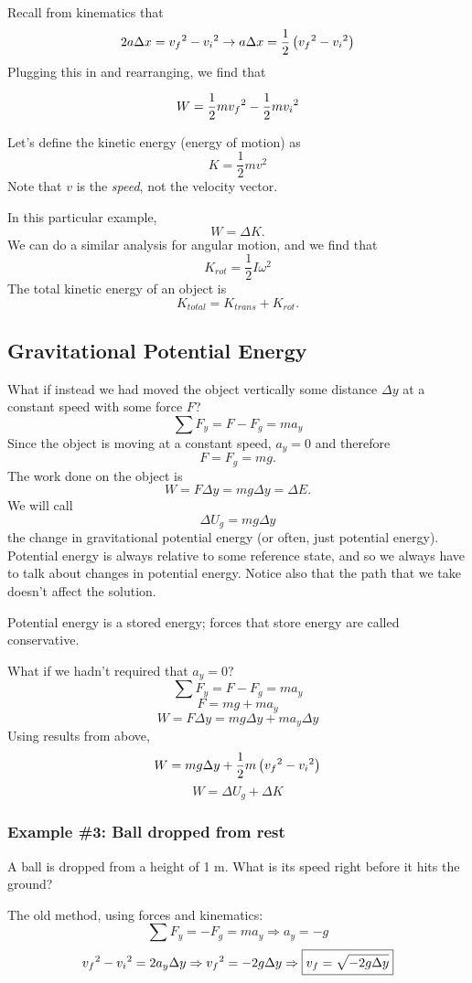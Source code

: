 Recall from kinematics that
$$2a\Delta x = v_f\displaystyle^2-v_i\displaystyle^2\rightarrow a\Delta x = \frac{1}{2}\left(v_f\displaystyle^2-v_i\displaystyle^2\right) $$
Plugging this in and rearranging, we find that

$$W=\frac{1}{2}mv_f\displaystyle^2-\frac{1}{2}mv_i\displaystyle^2$$

Let's define the kinetic energy (energy of motion) as
$$\boxed{K=\frac{1}{2}mv^2}$$
Note that $v$ is the \textit{speed}, not the velocity vector. 

In this particular example,
$$W=\Delta{K}.$$
We can do a similar analysis for angular motion, and we find that
$$\boxed{K_{rot}=\frac{1}{2}I\omega^2}$$
The total kinetic energy of an object is
$$K_{total}=K_{trans}+K_{rot}.$$

\subsection{Gravitational Potential Energy}
What if instead we had moved the object vertically some distance $\Delta y$ at a constant speed with some force $F$?
$$\sum F_y=F-F_g=ma_y$$
Since the object is moving at a constant speed, $a_y=0$ and therefore
$$F=F_g=mg.$$
The work done on the object is
$$W=F\Delta{y}=mg\Delta{y}=\Delta{E}.$$
We will call
$$\boxed{\Delta{U_g}=mg\Delta{y}}$$
the change in gravitational potential energy (or often, just potential energy). Potential energy is always relative to some reference state, and so we always have to talk about changes in potential energy. Notice also that the path that we take doesn't affect the solution.

Potential energy is a stored energy; forces that store energy are called conservative.

What if we hadn't required that $a_y=0$?
$$\sum F_y=F-F_g=ma_y$$
$$F=mg+ma_y$$
$$W = F\Delta y = mg\Delta y + ma_y\Delta y$$
Using results from above,
$$W = mg\Delta y + \frac{1}{2}m\left(v_f\displaystyle^2-v_i\displaystyle^2\right)$$
$$W = \Delta U_g + \Delta K$$


\subsubsection*{Example \#3: Ball dropped from rest}
A ball is dropped from a height of 1 m. What is its speed right before it hits the ground?

The old method, using forces and kinematics:
$$\sum F_y=-F_g=ma_y\Rightarrow a_y=-g$$
$$v_f\displaystyle^2-v_i\displaystyle^2=2a_y\Delta{y}\Rightarrow v_f\displaystyle^2=-2g\Delta{y}\Rightarrow \boxed{v_f=\sqrt{-2g\Delta{y}}}$$

